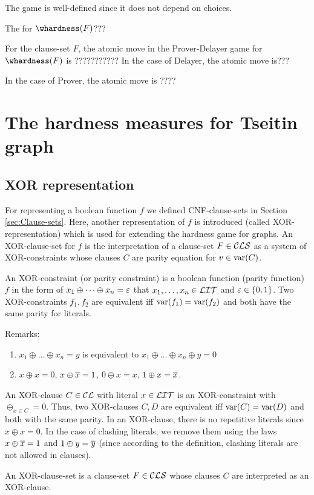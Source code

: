 \documentclass{report}
\begin{document}
\begin{lem}\label{lem:game1}
The game is well-defined since it does not depend on choices.
\end{lem}

The for  $\whardness(F)$???

\begin{defi}\label{def:atomic-move}
For the clause-set $F$, the atomic move in the Prover-Delayer game for $\whardness(F)$ is ???????????
In the case of Delayer, the atomic move is???

In the case of Prover, the atomic move is ????
\end{defi}
\chapter{The hardness measures for Tseitin graph}
\label{cha:hdgame}

\section{XOR representation}
\label{sec:XOR representation}
For representing a boolean function $f$ we defined CNF-clause-sets in Section \ref{sec:Clause-sets}. Here, another representation of $f$ is introduced (called XOR-representation) which is used for extending the hardness game for graphs. An XOR-clause-set for $f$ is the interpretation of a clause-set $F \in \mathcal{CLS}$ as a system of XOR-constraints whose clauses $C$ are parity equation for $v \in \operatorname{var}(C)$. 

\begin{defi}\label{def:xor-const} 
An XOR-constraint (or parity constraint) is a boolean function (parity function) $f$ in the form of $x_1 \oplus \dots \oplus x_n = \varepsilon$ that $x_1, \dots, x_n \in \mathcal{LIT}$ and $\varepsilon \in \{ 0,1 \}$. Two XOR-constraints $f_1, f_2$ are equivalent iff $\operatorname{var}(f_1) = \operatorname{var}(f_2)$ and both have the same parity for literals.
\end{defi}

Remarks:
\begin{enumerate}
    \item $x_1 \oplus \dots \oplus x_n = y$ is equivalent to $x_1 \oplus \dots \oplus x_n \oplus y = 0$
    \item $x \oplus x = 0$, $x \oplus \overline{x} = 1$, $0 \oplus x = x$, $1 \oplus x = \overline{x}$.
\end{enumerate}

\begin{defi}\label{def:xor-cls}
An XOR-clause $C \in \mathcal{CL}$ with literal $x \in \mathcal{LIT}$ is an XOR-constraint with $\oplus_{x \in C} = 0$. Thus, two XOR-clauses $C, D$ are equivalent iff $\operatorname{var}(C) = \operatorname{var}(D)$ and both with the same parity. In an XOR-clause, there is no repetitive literals since $x \oplus x = 0$. In the case of clashing literals, we remove them using the laws $x \oplus \overline{x} = 1$ and $1 \oplus y = \overline{y}$ (since according to the definition, clashing literals are not allowed in clauses).

An XOR-clause-set is a clause-set $F \in \mathcal{CLS}$ whose clauses $C$ are interpreted as an XOR-clause.  
\end{defi} 
\end{document}
